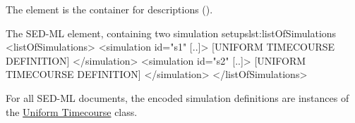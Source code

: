 \label{sec:listOfSimulations}

The  element is the container for  descriptions ().
%
%

%
\begin{myXmlLst}{The SED-ML  element, containing two simulation setups}{lst:listOfSimulations}
 <listOfSimulations>
  <simulation id="s1" [..]>
   [UNIFORM TIMECOURSE DEFINITION]
  </simulation>
  <simulation id="s2" [..]>
   [UNIFORM TIMECOURSE DEFINITION]
  </simulation>
 </listOfSimulations>
\end{myXmlLst}
%
For all SED-ML \LoneVone documents, the encoded simulation definitions are instances of the \hyperref[class:timeCourse]{Uniform Timecourse} class.


